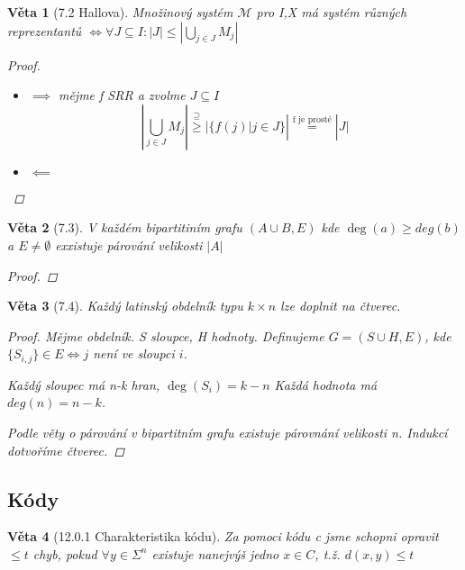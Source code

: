 \documentclass[10pt,a4paper]{article}
\theoremstyle{plain}
\newtheorem*{veta}{Věta}
\begin{document}
\begin{veta}[7.2 Hallova]
Množinový systém $\mathcal{M}$ pro I,X má systém různých reprezentantů $\iff \forall J \subseteq I: |J| \leq \left|\bigcup_{j \in J} M_j \right|$
\begin{proof}
\begin{itemize}
\item $\implies$ mějme f SRR a zvolme $J \subseteq I$
\[ \left|\bigcup_{j \in J} M_j \right| \overset{\supseteq}{\geq}  |\{ f(j) | j \in J\}| \overset{\text{f je prosté}}{=} |J| \]

\item $\impliedby$
\end{itemize}
\end{proof}
\end{veta}

\begin{veta}[7.3]
V každém bipartitiním grafu $(A \cup B, E)$ kde $\deg(a) \geq deg(b)$ a $E \neq \emptyset$
exxistuje párování velikosti $|A|$
\begin{proof}

\end{proof}
\end{veta}

\begin{veta} [7.4]
Každý latinský obdelník typu $k \times n$ lze doplnit na čtverec.
\begin{proof}
Mějme obdelník. S sloupce, H hodnoty. Definujeme $G = (S \cup H, E)$, kde $\{ S_{i,j} \} \in E \iff j$ není ve sloupci $i$.

Každý sloupec má n-k hran, $\deg(S_i) = k-n$ Každá hodnota má $deg(n) = n-k$.

Podle věty o párování v bipartitním grafu existuje párovnání velikosti n. Indukcí dotvoříme čtverec.
\end{proof}
\end{veta}

\subsection{Kódy}

\newcommand*{\maxerrors}{\lfloor \frac{d-1}2 \rfloor}

\begin{veta}[12.0.1 Charakteristika kódu]
Za pomoci kódu c jsme schopni opravit $\leq t$ chyb, pokud $\forall y \in \Sigma^n$ existuje nanejvýš jedno $x \in C$, t.ž. $d(x,y) \leq t$
\end{veta}
\end{document}
